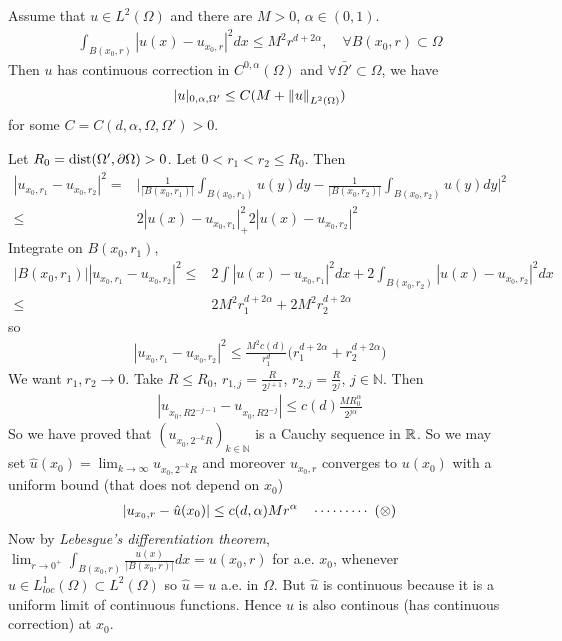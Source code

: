 \documentclass[12pt,a4paper]{article}
\newenvironment{proof}
{\begin{changemargin}{0.5cm}{0.5cm} 
	}%
	{\end{changemargin}
}
\newenvironment{p}
{\begin{proof} 
	}%
	{\end{proof}
}
\begin{document}
\thm Assume that $u\in L^2(\Omega)$ and there are $M>0$, $\alpha \in (0,1)$.
\begin{align*}
\int_{B(x_0, r)} |u (x) - u_{x_0, r}|^2 dx \leq M^2 r^{d+ 2\alpha}, \quad \forall B(x_0,r) \subset \Omega
\end{align*}
Then $u$ has continuous correction in $C^{0, \alpha}(\Omega)$ and $\forall \bar{\Omega'} \subset \Omega$, we have 
\begin{align*}
|u|_{0, \alpha, \Omega'} \leq C(M + \snorms{u}{L^2(\Omega)})
\end{align*}
for some $C= C(d, \alpha, \Omega, \Omega') >0$.
\begin{p}
\pf Let $R_0 = \text{dist}(\Omega', \partial \Omega) >0$. Let $0< r_1< r_2 \leq R_0$. Then
\begin{align*}
|u_{x_0, r_1} - u_{x_0, r_2}|^2 =& \Big| \frac{1}{|B(x_0, r_1)|} \int_{B(x_0, r_1)}u(y)dy - \frac{1}{|B(x_0, r_2)|} \int_{B(x_0, r_2)}u(y)dy  \Big|^2 \\
\leq& 2|u(x) - u_{x_0, r_1}|^2 _+ 2|u(x) - u_{x_0, r_2}|^2
\end{align*}
Integrate on $B(x_0, r_1)$,
\begin{align*}
|B(x_0, r_1)| |u_{x_0, r_1} - u_{x_0, r_2}|^2 \leq & 2 \int |u(x) - u_{x_0, r_1}|^2  dx + 2\int_{B(x_0, r_2)}|u(x) - u_{x_0, r_2}|^2 dx \\
\leq & 2M^2 r_1^{d + 2\alpha} + 2M^2 r_2^{d+ 2\alpha}
\end{align*}
so
\begin{align*}
|u_{x_0, r_1} - u_{x_0, r_2}|^2 \leq \frac{M^2 c(d)}{r_1^d} \big( r_1^{d+2\alpha} + r_2^{d+ 2\alpha} \big)
\end{align*}
We want $r_1, r_2\rightarrow 0$. Take $R\leq R_0$, $r_{1,j} = \frac{R}{2^{j+1}}$, $r_{2,j} = \frac{R}{2^{j}}$, $j\in \mathbb{N}$. Then
\begin{align*}
|u_{x_0, R2^{-j-1}} - u_{x_0, R2^{-j}}| \leq c(d) \frac{M R_0^{\alpha}}{2^{j\alpha}}
\end{align*}
So we have proved that $(u_{x_0, 2^{-k}R})_{k\in\mathbb{N}}$ is a Cauchy sequence in $\mathbb{R}$. So we may set $\hat{u}(x_0) = \lim_{k\rightarrow \infty} u_{x_0, 2^{-k}R}$ and moreover $u_{x_0, r}$ converges to $u(x_0)$ with a uniform bound (that does not depend on $x_0$)
\begin{align*}
|u_{x_0, r} - \hat{u}(x_0)| \leq c(d, \alpha) Mr^{\alpha} \quad \cdots\cdots\cdots\,\,(\otimes)
\end{align*}
Now by \emph{Lebesgue's differentiation theorem}, $\lim_{r\rightarrow 0^+} \int_{B(x_0, r)} \frac{u(x)}{|B(x_0, r)|} dx = u(x_0, r)$ for a.e. $x_0$, whenever $u\in L^1_{loc}(\Omega) \subset L^2(\Omega)$ so $\hat{u} = u$ a.e. in $\Omega$. But $\hat{u}$ is continuous because it is a uniform limit of continuous functions. Hence $u$ is also continous (has continuous correction) at $x_0$.
\s


\end{p}
\end{document}
